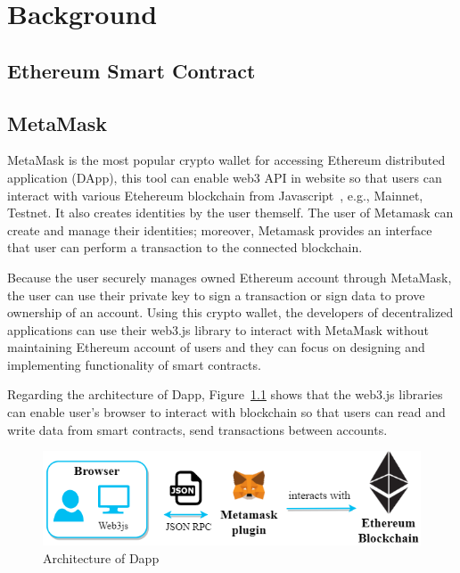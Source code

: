 \chapter{Background}
\label{chapter:background}

\section{Ethereum Smart Contract}

\newpage
\section{MetaMask}
MetaMask is the most popular crypto wallet for accessing Ethereum distributed application (DApp), this tool can enable web3 API in website so that users can interact with various Etehereum blockchain from Javascript~\cite{web3.js}, e.g., Mainnet, Testnet. It also creates identities by the user themself. The user of Metamask can create and manage their identities; moreover, Metamask provides an interface that user can perform a transaction to the connected blockchain.\par
Because the user securely  manages owned Ethereum account through MetaMask, the user can use their private key to sign a transaction or sign data to prove ownership of an account. Using this crypto wallet, the developers of decentralized applications can use their web3.js library to interact with MetaMask without maintaining Ethereum account of users and they can focus on designing and implementing functionality of smart contracts.\par
Regarding the architecture of Dapp, Figure~\ref{fig:architecture_of_dapp} shows that the web3.js libraries can enable user's browser to interact with blockchain so that users can read and write data from smart contracts, send transactions between accounts. 

\begin{figure}[hb]
    \centering
    \includegraphics[height=!,width=1\linewidth,keepaspectratio=true]{figures/architecture_of_dapp.png}
    \caption{{\footnotesize Architecture of Dapp}}
    \label{fig:architecture_of_dapp}
\end{figure}

